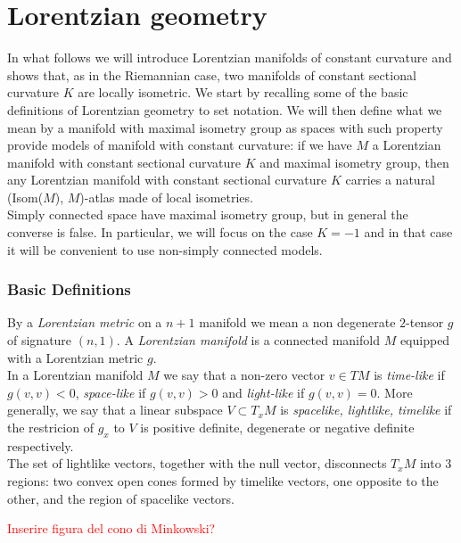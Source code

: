 \chapter{Lorentzian geometry}

In what follows we will introduce Lorentzian manifolds of constant curvature and shows that, as in the Riemannian case, two manifolds of constant sectional curvature $K$ are locally isometric. We start by recalling some of the basic definitions of Lorentzian geometry to set notation. We will then define what we mean by a manifold with maximal isometry group as spaces with such property provide models of manifold with constant curvature: if we have $M$ a Lorentzian manifold with constant sectional curvature $K$ and maximal isometry group, then any Lorentzian manifold with constant sectional curvature $K$ carries a natural (Isom($M$), $M$)-atlas made of local isometries. \\
Simply connected space have maximal isometry group, but in general the converse is false. In particular, we will focus on the case $K=-1$ and in that case it will be convenient to use non-simply connected models. 

\subsection{Basic Definitions}
By a \textit{Lorentzian metric} on a $n+1$ manifold we mean a non degenerate $2$-tensor $g$ of signature $(n,1)$. A \textit{Lorentzian manifold} is a connected manifold $M$ equipped with a Lorentzian metric $g$.\\
In a Lorentzian manifold $M$ we say that a non-zero vector $v \in TM$ is \textit{time-like} if $g(v,v)<0$, \textit{space-like} if $g(v,v)>0$ and \textit{light-like} if $g(v,v)=0$. More generally, we say that a linear subspace $V \subset T_{x}M$ is \textit{spacelike, lightlike, timelike} if the restricion of $g_x$ to $V$ is positive definite, degenerate or negative definite respectively.\\
The set of lightlike vectors, together with the null vector, disconnects $T_{x}M$ into 3 regions: two convex open cones formed by timelike vectors, one opposite to the other, and the region of spacelike vectors. 

\textcolor{red}{Inserire figura del cono di Minkowski?}

